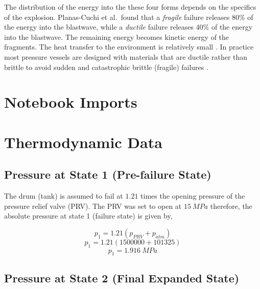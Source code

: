 \documentclass[10pt,parskip=half,
toc=sectionentrywithdots,
bibliography=totocnumbered,
captions=tableheading,numbers=noendperiod]{scrartcl}
\begin{document}
The distribution of the energy into the these four forms depends on the
specifics of the explosion. Planas-Cuchi et al.~found that a
\emph{fragile} failure releases 80\% of the energy into the blastwave,
while a \emph{ductile} failure releases 40\% of the energy into the
blastwave. The remaining energy becomes kinetic energy of the fragments.
The heat transfer to the environment is relatively small
\cite{Planas2004}. In practice most pressure vessels are designed with
materials that are ductile rather than brittle to avoid sudden and
catastrophic brittle (fragile) failures \cite{Benac2016}.

\hypertarget{notebook-imports}{%
\section{Notebook Imports}\label{notebook-imports}}

\hypertarget{thermodynamic-data}{%
\section{Thermodynamic Data}\label{thermodynamic-data}}

\hypertarget{pressure-at-state-1-pre-failure-state}{%
\subsection{Pressure at State 1 (Pre-failure
State)}\label{pressure-at-state-1-pre-failure-state}}

The drum (tank) is assumed to fail at \(1.21\) times the opening
pressure of the pressure relief valve (PRV)\cite{Engineers2013}. The PRV
was set to open at \(15\:MPa\) therefore, the absolute pressure at state
1 (failure state) is given by,

\begin{equation}p_1 = 1.21\left(p_{PRV}+p_{atm}\right)\end{equation}
\begin{equation}p_1 = 1.21\left(1500000+101325\right)\end{equation}
\begin{equation}p_1 = 1.916\:MPa\end{equation}

\hypertarget{pressure-at-state-2-final-expanded-state}{%
\subsection{Pressure at State 2 (Final Expanded
State)}\label{pressure-at-state-2-final-expanded-state}}
\end{document}
